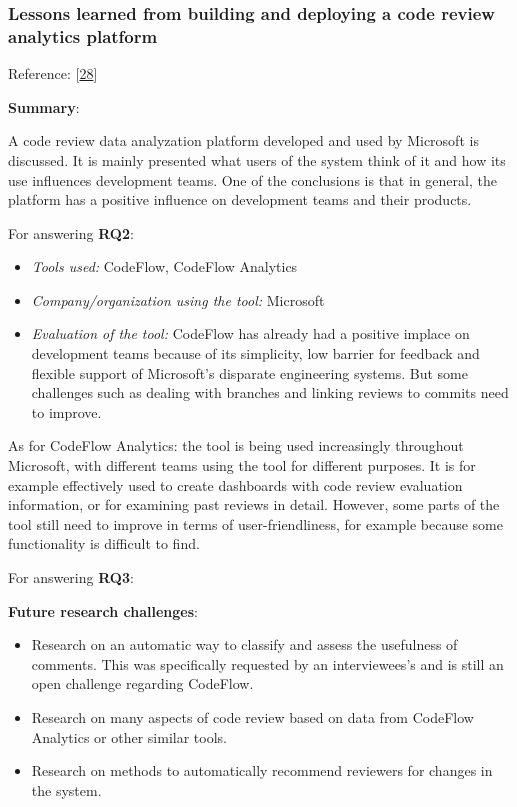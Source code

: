 \documentclass[]{book}
\providecommand{\tightlist}{%
  \setlength{\itemsep}{0pt}\setlength{\parskip}{0pt}}
\begin{document}
\subsubsection{Lessons learned from building and deploying a code review
analytics
platform}\label{lessons-learned-from-building-and-deploying-a-code-review-analytics-platform}

Reference: {[}\protect\hyperlink{ref-bird2015lessons}{28}{]}

\textbf{Summary}:

A code review data analyzation platform developed and used by Microsoft
is discussed. It is mainly presented what users of the system think of
it and how its use influences development teams. One of the conclusions
is that in general, the platform has a positive influence on development
teams and their products.

For answering \textbf{RQ2}:

\begin{itemize}
\tightlist
\item
  \emph{Tools used:} CodeFlow, CodeFlow Analytics
\item
  \emph{Company/organization using the tool:} Microsoft
\item
  \emph{Evaluation of the tool:} CodeFlow has already had a positive
  implace on development teams because of its simplicity, low barrier
  for feedback and flexible support of Microsoft's disparate engineering
  systems. But some challenges such as dealing with branches and linking
  reviews to commits need to improve.
\end{itemize}

As for CodeFlow Analytics: the tool is being used increasingly
throughout Microsoft, with different teams using the tool for different
purposes. It is for example effectively used to create dashboards with
code review evaluation information, or for examining past reviews in
detail. However, some parts of the tool still need to improve in terms
of user-friendliness, for example because some functionality is
difficult to find.

For answering \textbf{RQ3}:

\textbf{Future research challenges}:

\begin{itemize}
\tightlist
\item
  Research on an automatic way to classify and assess the usefulness of
  comments. This was specifically requested by an interviewees's and is
  still an open challenge regarding CodeFlow.
\item
  Research on many aspects of code review based on data from CodeFlow
  Analytics or other similar tools.
\item
  Research on methods to automatically recommend reviewers for changes
  in the system.
\end{itemize}
\end{document}
